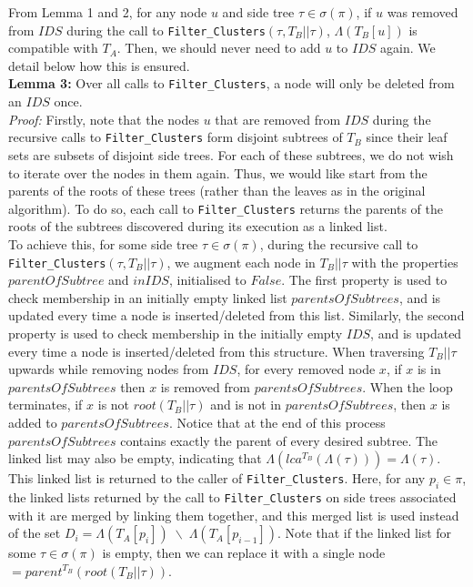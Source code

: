 \documentclass{article}
\begin{document}
    From Lemma 1 and 2, for any node $u$ and side tree $\tau \in \sigma(\pi)$, if $u$ was removed from $IDS$ during the call to \texttt{Filter\_Clusters}$(\tau, T_B||\tau)$, $\Lambda(T_B[u])$ is compatible with $T_A$. Then, we should never need to add $u$ to $IDS$ again. We detail below how this is ensured.\\

    \textbf{Lemma 3:} Over all calls to \texttt{Filter\_Clusters}, a node will only be deleted from an $IDS$ once.\\
    \textit{Proof:} Firstly, note that the nodes $u$ that are removed from $IDS$ during the recursive calls to \texttt{Filter\_Clusters} form disjoint subtrees of $T_B$ since their leaf sets are subsets of disjoint side trees. For each of these subtrees, we do not wish to iterate over the nodes in them again. Thus, we would like start from the parents of the roots of these trees (rather than the leaves as in the original algorithm). To do so, each call to \texttt{Filter\_Clusters} returns the parents of the roots of the subtrees discovered during its execution as a linked list.\\

    To achieve this, for some side tree $\tau \in \sigma(\pi)$, during the recursive call to \texttt{Filter\_Clusters}$(\tau, T_B||\tau)$, we augment each node in $T_B||\tau$ with the properties $parentOfSubtree$ and $inIDS$, initialised to $False$. The first property is used to check membership in an initially empty linked list $parentsOfSubtrees$, and is updated every time a node is inserted/deleted from this list. Similarly, the second property is used to check membership in the initially empty $IDS$, and is updated every time a node is inserted/deleted from this structure. When traversing $T_B||\tau$ upwards while removing nodes from $IDS$, for every removed node $x$, if $x$ is in $parentsOfSubtrees$ then $x$ is removed from $parentsOfSubtrees$. When the loop terminates, if $x$ is not $root(T_B||\tau)$ and is not in $parentsOfSubtrees$, then $x$ is added to $parentsOfSubtrees$. Notice that at the end of this process $parentsOfSubtrees$ contains exactly the parent of every desired subtree. The linked list may also be empty, indicating that $\Lambda(lca^{T_B}(\Lambda(\tau))) = \Lambda(\tau)$.\\

    This linked list is returned to the caller of \texttt{Filter\_Clusters}. Here, for any $p_i \in \pi$, the linked lists returned by the call to \texttt{Filter\_Clusters} on side trees associated with it are merged by linking them together, and this merged list is used instead of the set $D_i = \Lambda(T_A[p_i]) \;\backslash\; \Lambda(T_A[p_{i-1}])$. Note that if the linked list for some $\tau \in \sigma(\pi)$ is empty, then we can replace it with a single node $= parent^{T_B}(root(T_B||\tau))$.\\
\end{document}
